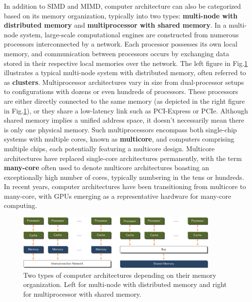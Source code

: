 \par

In addition to SIMD and MIMD, computer architecture can also be categorized based on its memory organization, typically into two types: \textbf{multi-node with distributed memory} and \textbf{multiprocessor with shared memory}.
In a multi-node system, large-scale computational engines are constructed from numerous processors interconnected by a network. Each processor possesses its own local memory, and communication between processors occurs by exchanging data stored in their respective local memories over the network. The left figure in Fig.\ref{fig:multinode_vs_multicore} illustrates a typical multi-node system with distributed memory, often referred to as \textbf{clusters}.
Multiprocessor architectures vary in size from dual-processor setups to configurations with dozens or even hundreds of processors. These processors are either directly connected to the same memory (as depicted in the right figure in Fig.\ref{fig:multinode_vs_multicore}), or they share a low-latency link such as PCI-Express or PCIe.
Although shared memory implies a unified address space, it doesn't necessarily mean there is only one physical memory. Such multiprocessors encompass both single-chip systems with multiple cores, known as \textbf{multicore}, and computers comprising multiple chips, each potentially featuring a multicore design.
Multicore architectures have replaced single-core architectures permanently, with the term \textbf{many-core} often used to denote multicore architectures boasting an exceptionally high number of cores, typically numbering in the tens or hundreds.
In recent years, computer architectures have been transitioning from multicore to many-core, with GPUs emerging as a representative hardware for many-core computing.

\begin{figure}[!h]
\centering\includegraphics[width=0.9\textwidth]{fig_hardware/multinode_vs_multicore.jpg}
\caption{Two types of computer architectures depending on their memory organization. Left for multi-node with distributed memory and right for multiprocessor with shared memory.}\label{fig:multinode_vs_multicore}
\end{figure}


